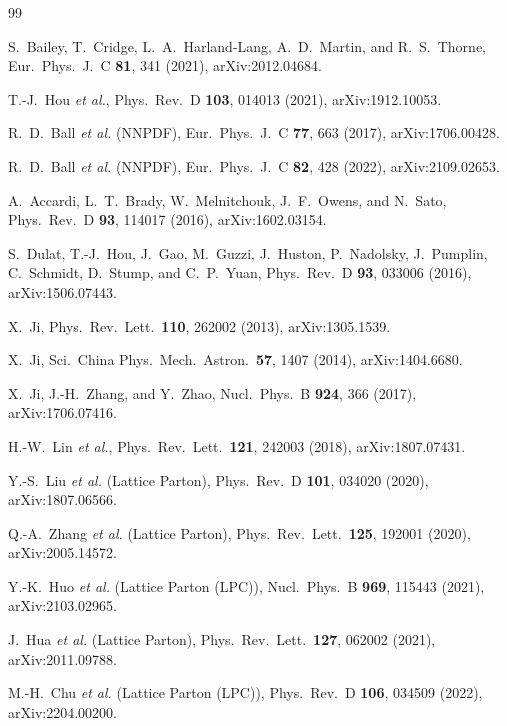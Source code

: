 \documentclass[12pt,a4paper]{ctexart}
\begin{document}

\begin{thebibliography}{99}

 S.~Bailey, T.~Cridge, L.~A.~Harland-Lang, A.~D.~Martin, and R.~S.~Thorne, Eur.\ Phys.\ J.\ C \textbf{81}, 341 (2021), arXiv:2012.04684.

 T.-J.~Hou \textit{et al.}, Phys.\ Rev.\ D \textbf{103}, 014013 (2021), arXiv:1912.10053.

 R.~D.~Ball \textit{et al.} (NNPDF), Eur.\ Phys.\ J.\ C \textbf{77}, 663 (2017), arXiv:1706.00428.

 R.~D.~Ball \textit{et al.} (NNPDF), Eur.\ Phys.\ J.\ C \textbf{82}, 428 (2022), arXiv:2109.02653.

 A.~Accardi, L.~T.~Brady, W.~Melnitchouk, J.~F.~Owens, and N.~Sato, Phys.\ Rev.\ D \textbf{93}, 114017 (2016), arXiv:1602.03154.

 S.~Dulat, T.-J.~Hou, J.~Gao, M.~Guzzi, J.~Huston, P.~Nadolsky, J.~Pumplin, C.~Schmidt, D.~Stump, and C.~P.~Yuan, Phys.\ Rev.\ D \textbf{93}, 033006 (2016), arXiv:1506.07443.

 X.~Ji, Phys.\ Rev.\ Lett.\ \textbf{110}, 262002 (2013), arXiv:1305.1539.

 X.~Ji, Sci.\ China Phys.\ Mech.\ Astron.\ \textbf{57}, 1407 (2014), arXiv:1404.6680.

 X.~Ji, J.-H.~Zhang, and Y.~Zhao, Nucl.\ Phys.\ B \textbf{924}, 366 (2017), arXiv:1706.07416.

 H.-W.~Lin \textit{et al.}, Phys.\ Rev.\ Lett.\ \textbf{121}, 242003 (2018), arXiv:1807.07431.

 Y.-S.~Liu \textit{et al.} (Lattice Parton), Phys.\ Rev.\ D \textbf{101}, 034020 (2020), arXiv:1807.06566.

 Q.-A.~Zhang \textit{et al.} (Lattice Parton), Phys.\ Rev.\ Lett.\ \textbf{125}, 192001 (2020), arXiv:2005.14572.

 Y.-K.~Huo \textit{et al.} (Lattice Parton (LPC)), Nucl.\ Phys.\ B \textbf{969}, 115443 (2021), arXiv:2103.02965.

 J.~Hua \textit{et al.} (Lattice Parton), Phys.\ Rev.\ Lett.\ \textbf{127}, 062002 (2021), arXiv:2011.09788.

 M.-H.~Chu \textit{et al.} (Lattice Parton (LPC)), Phys.\ Rev.\ D \textbf{106}, 034509 (2022), arXiv:2204.00200.


\end{thebibliography}
\end{document}
